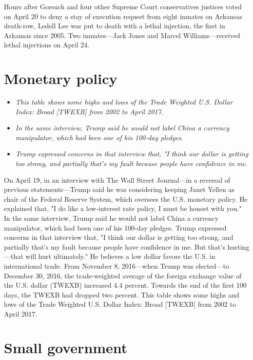 Hours after Gorsuch and four other Supreme Court conservatives justices
voted on April 20 to deny a stay of execution request from eight inmates
on Arkansas death-row, Ledell Lee was put to death with a lethal
injection, the first in Arkansas since 2005. Two inmates---Jack Jones
and Marcel Williams---received lethal injections on April 24.

\section{Monetary policy}\label{monetary-policy}

\begin{itemize}
\item
  \emph{This table shows some highs and lows of the Trade Weighted U.S.
  Dollar Index: Broad {[}TWEXB{]} from 2002 to April 2017.}
\item
  \emph{In the same interview, Trump said he would not label China a
  currency manipulator, which had been one of his 100-day pledges.}
\item
  \emph{Trump expressed concerns in that interview that, "I think our
  dollar is getting too strong, and partially that's my fault because
  people have confidence in me.}
\end{itemize}

On April 19, in an interview with The Wall Street Journal---in a
reversal of previous statements---Trump said he was considering keeping
Janet Yellen as chair of the Federal Reserve System, which oversees the
U.S. monetary policy. He explained that, "I do like a low-interest rate
policy, I must be honest with you." In the same interview, Trump said he
would not label China a currency manipulator, which had been one of his
100-day pledges. Trump expressed concerns in that interview that, "I
think our dollar is getting too strong, and partially that's my fault
because people have confidence in me. But that's hurting---that will
hurt ultimately." He believes a low dollar favors the U.S. in
international trade. From November 8, 2016---when Trump was elected---to
December 30, 2016, the trade-weighted average of the foreign exchange
value of the U.S. dollar (TWEXB) increased 4.4 percent. Towards the end
of the first 100 days, the TWEXB had dropped two percent. This table
shows some highs and lows of the Trade Weighted U.S. Dollar Index: Broad
{[}TWEXB{]} from 2002 to April 2017.

\section{Small government}\label{small-government}

